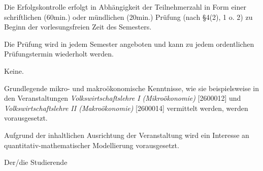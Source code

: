 \begin{course}

\setdoclanguagegerman
{}



\coursehead


\label{cour_7081.dp_997}


\begin{styleenv}
\begin{assessment}
Die Erfolgskontrolle erfolgt in Abhängigkeit der Teilnehmerzahl in Form einer schriftlichen (60min.) oder mündlichen (20min.) Prüfung (nach §4(2), 1 o. 2) zu Beginn der vorlesungsfreien Zeit des Semesters.

 

Die Prüfung wird in jedem Semester angeboten und kann zu jedem ordentlichen Prüfungstermin wiederholt werden.


\end{assessment}

\begin{conditions}Keine.\end{conditions}

\begin{recommendations}Grundlegende mikro- und makroökonomische Kenntnisse, wie sie beispielsweise in den Veranstaltungen \emph{Volkswirtschaftslehre I (Mikroökonomie)} [2600012] und \emph{Volkswirtschaftslehre II (Makroökonomie)} [2600014] vermittelt werden, werden vorausgesetzt.

 

Aufgrund der inhaltlichen Ausrichtung der Veranstaltung wird ein Interesse an quantitativ-mathematischer Modellierung vorausgesetzt.

\end{recommendations}
\end{styleenv}

\begin{learningoutcomes}
Der/die Studierende


\end{learningoutcomes}
\end{course}
